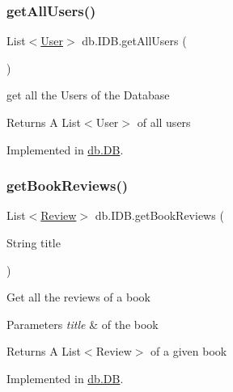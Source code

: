 \subsubsection{\texorpdfstring{get\+All\+Users()}{getAllUsers()}}
{\footnotesize\ttfamily List$<$\hyperlink{classserver_1_1data_1_1_user}{User}$>$ db.\+I\+D\+B.\+get\+All\+Users (\begin{DoxyParamCaption}{ }\end{DoxyParamCaption})}

get all the Users of the Database \begin{DoxyReturn}{Returns}
A List$<$\+User$>$ of all users 
\end{DoxyReturn}


Implemented in \hyperlink{classdb_1_1_d_b_ad02e4c78f9afe64af34fb2e5889ce501}{db.\+DB}.

\mbox{\label{interfacedb_1_1_i_d_b_a6b8fda48df77b542b8713bc4f035bccf}} 
\subsubsection{\texorpdfstring{get\+Book\+Reviews()}{getBookReviews()}}
{\footnotesize\ttfamily List$<$\hyperlink{classserver_1_1data_1_1_review}{Review}$>$ db.\+I\+D\+B.\+get\+Book\+Reviews (\begin{DoxyParamCaption}\item[{String}]{title }\end{DoxyParamCaption})}

Get all the reviews of a book 
\begin{DoxyParams}{Parameters}
{\em title} & of the book \\
\hline
\end{DoxyParams}
\begin{DoxyReturn}{Returns}
A List$<$\+Review$>$ of a given book 
\end{DoxyReturn}


Implemented in \hyperlink{classdb_1_1_d_b_a02a42ee97d8e7189733dfc720a05452e}{db.\+DB}.

\mbox{\label{interfacedb_1_1_i_d_b_afd7ee8924344c13a64a1363d1a295771}} 
